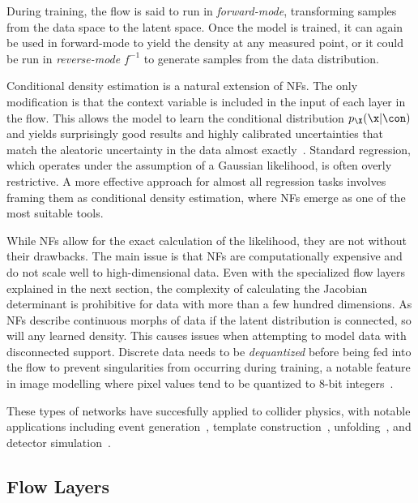 During training, the flow is said to run in \textit{forward-mode}, transforming samples from the data space to the latent space.
Once the model is trained, it can again be used in forward-mode to yield the density at any measured point, or it could be run in \textit{reverse-mode} $f^{-1}$ to generate samples from the data distribution.

Conditional density estimation is a natural extension of NFs.
The only modification is that the context variable is included in the input of each layer in the flow.
This allows the model to learn the conditional distribution $p_{\X}(\x|\con)$ and yields surprisingly good results and highly calibrated uncertainties that match the aleatoric uncertainty in the data almost exactly~\cite{SolvingInverseProblems, InferenceAstrophysicalParameters, ComposingNormalizingFlows, NormalizingFlowsProbabilistic}.
Standard regression, which operates under the assumption of a Gaussian likelihood, is often overly restrictive.
A more effective approach for almost all regression tasks involves framing them as conditional density estimation, where NFs emerge as one of the most suitable tools.

While NFs allow for the exact calculation of the likelihood, they are not without their drawbacks.
The main issue is that NFs are computationally expensive and do not scale well to high-dimensional data.
Even with the specialized flow layers explained in the next section, the complexity of calculating the Jacobian determinant is prohibitive for data with more than a few hundred dimensions.
As NFs describe continuous morphs of data if the latent distribution is connected, so will any learned density.
This causes issues when attempting to model data with disconnected support.
Discrete data needs to be \textit{dequantized} before being fed into the flow to prevent singularities from occurring during training, a notable feature in image modelling where pixel values tend to be quantized to 8-bit integers~\cite{FlowImprovingFlowBased}.

These types of networks have succesfully applied to collider physics, with notable applications including event generation~\cite{EventGen}, template construction~\cite{ANODE, CATHODE, CURTAINs}, unfolding~\cite{PartonsAndBack}, and detector simulation~\cite{CaloFlow, CaloFlow2}.

\subsection{Flow Layers}

